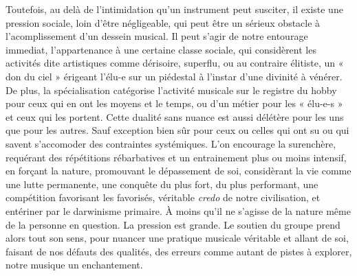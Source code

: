 Toutefois, au delà de l'intimidation qu'un instrument peut susciter, il existe une pression sociale, loin d'être négligeable, qui peut être un sérieux obstacle à l'acomplissement d'un dessein musical. 
Il peut s'agir de notre entourage immediat, l’appartenance à une certaine classe sociale, 
qui considèrent les activités dite artistiques comme dérisoire, superflu, ou au contraire élitiste, un « don du ciel » érigeant l’élu-e sur un piédestal à l’instar d’une divinité à vénérer. De plus, la spécialisation catégorise l'activité musicale sur le registre du hobby pour ceux qui en ont les moyens et le temps, ou d'un métier pour les « élu-e-s » et ceux qui les portent. Cette dualité sans nuance est aussi délétère pour les uns que pour les autres. Sauf exception bien sûr pour ceux ou celles qui ont su ou qui savent s'accomoder des contraintes systémiques. L'on encourage la surenchère, requérant des répétitions rébarbatives et un entrainement plus ou moins intensif, en forçant la nature, promouvant le dépassement de soi, considèrant la vie comme une lutte permanente, une conquête du plus fort, du plus performant, une compétition favorisant les favorisés, véritable \textit{credo} de notre civilisation, et entériner par le darwinisme primaire. À moins qu’il ne s’agisse de la nature même de la personne en question. La pression est grande. Le soutien du groupe prend alors tout son sens, pour nuancer une pratique musicale véritable et allant de soi, faisant de nos défauts des qualités, des erreurs comme autant de pistes à explorer, notre musique un enchantement.

